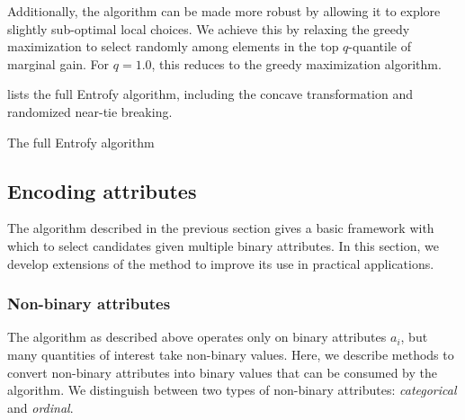 \documentclass[12pt]{article}
\begin{document}
Additionally, the algorithm can be made more robust by allowing it to explore slightly sub-optimal local choices. We achieve this by relaxing the greedy maximization to select randomly among elements in the top $q$-quantile of marginal gain. For $q=1.0$, this reduces to the greedy maximization algorithm.

 lists the full Entrofy algorithm, including the concave transformation and randomized near-tie breaking.

\begin{algorithm}[H]
\caption{The full Entrofy algorithm}\label{alg:entrofy}
\begin{algorithmic}[1]
\EndWhile{}
\EndProcedure{}
\Statex{}
\EndFor{}
\EndProcedure{}
\end{algorithmic}
\end{algorithm}

\subsection*{Encoding attributes}
The algorithm described in the previous section gives a basic framework with which to select candidates given multiple binary attributes.  In this section, we develop extensions of the method to improve its use in practical applications.

\subsubsection*{Non-binary attributes}
The algorithm as described above operates only on binary attributes $a_i$, but many quantities of interest take non-binary values.  Here, we describe methods to convert non-binary attributes into binary values that can be consumed by the algorithm.
We distinguish between two types of non-binary attributes: \emph{categorical} and \emph{ordinal}.
\end{document}
